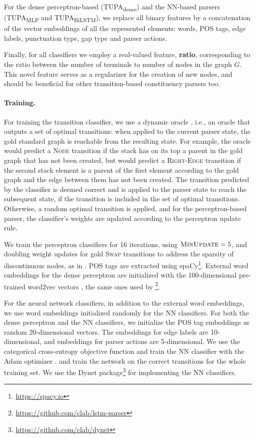 \documentclass[11pt,a4paper]{article}
\newcommand{\parser}[1]{TUPA\textsubscript{#1}}
\begin{document}
For the dense perceptron-based (\parser{dense}) and the NN-based parsers
(\parser{MLP} and \parser{BiLSTM}),
we replace all binary features by a
concatenation of the vector embeddings of all the represented elements:
words, POS tags, edge labels, punctuation type, gap type and parser actions.

Finally, for all classifiers we employ a real-valued feature,
\textbf{ratio}, corresponding to the ratio between the number of terminals to number of nodes
in the graph $G$.
This novel feature serves as a regularizer for the creation of new nodes,
and should be beneficial for other transition-based constituency parsers too.

\paragraph{Training.}
For training the transition classifier, we use a dynamic oracle \cite{goldberg2012dynamic},
i.e., an oracle that outputs a set of optimal transitions: when
applied to the current parser state, the gold
standard graph is reachable from the resulting state.
For example, the oracle would predict a \textsc{Node} transition if the stack 
has on its top a parent in the gold graph that has not been created,
but would predict a \textsc{Right-Edge} transition if the second stack
element is a parent of the
first element according to the gold graph and the edge between them has not been created.
The transition predicted by the classifier is deemed correct
and is applied to the parser state to reach the subsequent state,
if the transition is included in the set of optimal transitions.
Otherwise, a random optimal transition is applied,
and for the perceptron-based parser, the classifier's weights are updated according
to the perceptron update rule.

We train the perceptron classifiers for 16 iterations, using $\textsc{MinUpdate}=5$,
and doubling weight updates
for gold \textsc{Swap} transitions to address the sparsity of discontinuous nodes,
as in \citet{maier2015discontinuous}.
POS tags are extracted using spaCy\footnote{\url{https://spacy.io}}.
External word embeddings for the dense perceptron are initialized with the
100-dimensional pre-trained word2vec vectors \cite{mikolov2013efficient},
the same ones used by \citet{dyer2015transition}\footnote{
\url{https://github.com/clab/lstm-parser}}.

For the neural network classifiers, in addition to the external word embeddings, we use
word embeddings initialized randomly for the NN classifiers.
For both the dense perceptron and the NN classifiers, we initialize the POS tag embeddings as random 20-dimensional vectors. The embeddings for edge labels are 10-dimensional, and embeddings for parser actions are 5-dimensional.
We use the categorical cross-entropy objective function and train the
NN classifier with the Adam optimizer \cite{kingma2014adam}.
and train the network on the correct transitions for the whole training set.
We use the Dynet package\footnote{\url{https://github.com/clab/dynet}} for implementing the NN classifiers.
\end{document}
